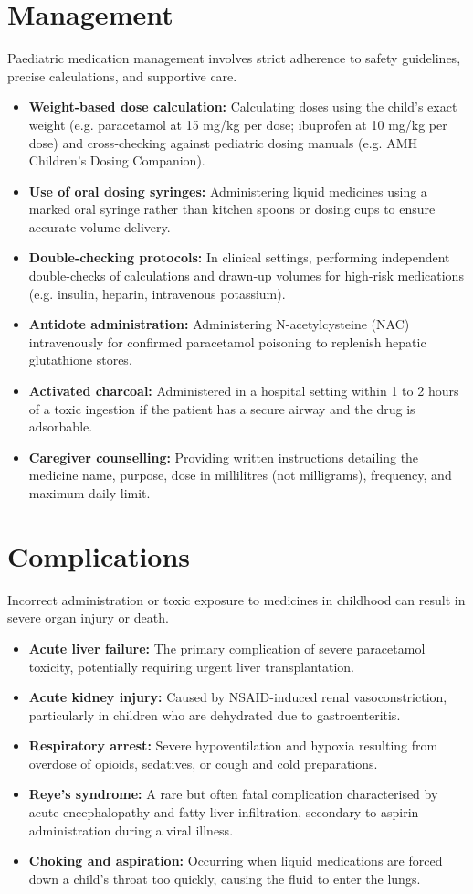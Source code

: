 \section*{Management}
Paediatric medication management involves strict adherence to safety guidelines, precise calculations, and supportive care.
\begin{itemize}
    \item \textbf{Weight-based dose calculation:} Calculating doses using the child's exact weight (e.g. paracetamol at 15 mg/kg per dose; ibuprofen at 10 mg/kg per dose) and cross-checking against pediatric dosing manuals (e.g. AMH Children's Dosing Companion).
    \item \textbf{Use of oral dosing syringes:} Administering liquid medicines using a marked oral syringe rather than kitchen spoons or dosing cups to ensure accurate volume delivery.
    \item \textbf{Double-checking protocols:} In clinical settings, performing independent double-checks of calculations and drawn-up volumes for high-risk medications (e.g. insulin, heparin, intravenous potassium).
    \item \textbf{Antidote administration:} Administering N-acetylcysteine (NAC) intravenously for confirmed paracetamol poisoning to replenish hepatic glutathione stores.
    \item \textbf{Activated charcoal:} Administered in a hospital setting within 1 to 2 hours of a toxic ingestion if the patient has a secure airway and the drug is adsorbable.
    \item \textbf{Caregiver counselling:} Providing written instructions detailing the medicine name, purpose, dose in millilitres (not milligrams), frequency, and maximum daily limit.
\end{itemize}

\section*{Complications}
Incorrect administration or toxic exposure to medicines in childhood can result in severe organ injury or death.
\begin{itemize}
    \item \textbf{Acute liver failure:} The primary complication of severe paracetamol toxicity, potentially requiring urgent liver transplantation.
    \item \textbf{Acute kidney injury:} Caused by NSAID-induced renal vasoconstriction, particularly in children who are dehydrated due to gastroenteritis.
    \item \textbf{Respiratory arrest:} Severe hypoventilation and hypoxia resulting from overdose of opioids, sedatives, or cough and cold preparations.
    \item \textbf{Reye's syndrome:} A rare but often fatal complication characterised by acute encephalopathy and fatty liver infiltration, secondary to aspirin administration during a viral illness.
    \item \textbf{Choking and aspiration:} Occurring when liquid medications are forced down a child's throat too quickly, causing the fluid to enter the lungs.
\end{itemize}

